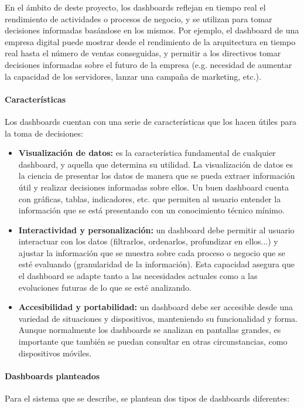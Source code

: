 En el ámbito de deste proyecto, los dashboards reflejan en tiempo real el
rendimiento de actividades o procesos de negocio, y se utilizan para tomar
decisiones informadas basándose en los mismos. Por ejemplo, el dashboard de una
empresa digital puede mostrar desde el rendimiento de la arquitectura en tiempo
real hasta el número de ventas conseguidas, y permitir a los directivos tomar
decisiones informadas sobre el futuro de la empresa (e.g. necesidad de aumentar
la capacidad de los servidores, lanzar una campaña de marketing, etc.).

\paragraph{Características}
Los dashboards cuentan con una serie de características que los hacen útiles
para la toma de decisiones:~\cite{mier2023dashboards}

\begin{itemize}
	\item \textbf{Visualización de datos:} es la característica fundamental de
		cualquier dashboard, y aquella que determina su utilidad.
		La visualización de datos es la ciencia de presentar los datos de manera
		que se pueda extraer información útil y realizar decisiones informadas
		sobre ellos. Un buen dashboard cuenta con gráficas, tablas, indicadores,
		etc. que permiten al usuario entender la información que se está
		presentando con un conocimiento técnico mínimo.
	\item \textbf{Interactividad y personalización:} un dashboard debe permitir
		al usuario interactuar con los datos (filtrarlos, ordenarlos,
		profundizar en ellos...) y ajustar la información que se muestra sobre
		cada proceso o negocio que se esté evaluando (granularidad de la
		información). Esta capacidad asegura que el dashboard se adapte tanto a
		las necesidades actuales como a las evoluciones futuras de lo que se
		esté analizando.
	\item \textbf{Accesibilidad y portabilidad:} un dashboard debe ser accesible
		desde una variedad de situaciones y dispositivos, manteniendo su
		funcionalidad y forma. Aunque normalmente los dashboards se analizan en
		pantallas grandes, es importante que también se puedan consultar en
		otras circunstancias, como dispositivos móviles.
\end{itemize}


\newpage{}
\paragraph{Dashboards planteados} 
Para el sistema que se describe, se plantean dos tipos de dashboards diferentes:


